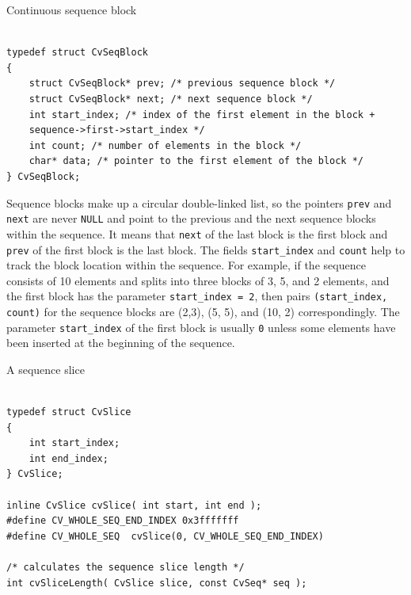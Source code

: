 \label{CvSeqBlock}

Continuous sequence block

\begin{lstlisting}

typedef struct CvSeqBlock
{
    struct CvSeqBlock* prev; /* previous sequence block */
    struct CvSeqBlock* next; /* next sequence block */
    int start_index; /* index of the first element in the block +
    sequence->first->start_index */
    int count; /* number of elements in the block */
    char* data; /* pointer to the first element of the block */
} CvSeqBlock;

\end{lstlisting}

Sequence blocks make up a circular double-linked list, so the pointers
\texttt{prev} and \texttt{next} are never \texttt{NULL} and point to the
previous and the next sequence blocks within the sequence. It means that
\texttt{next} of the last block is the first block and \texttt{prev} of
the first block is the last block. The fields \texttt{start\_index} and
\texttt{count} help to track the block location within the sequence. For
example, if the sequence consists of 10 elements and splits into three
blocks of 3, 5, and 2 elements, and the first block has the parameter
\texttt{start\_index = 2}, then pairs \texttt{(start\_index, count)} for the sequence
blocks are
(2,3), (5, 5), and (10, 2)
correspondingly. The parameter
\texttt{start\_index} of the first block is usually \texttt{0} unless
some elements have been inserted at the beginning of the sequence.

\label{CvSlice}

A sequence slice

\begin{lstlisting}

typedef struct CvSlice
{
    int start_index;
    int end_index;
} CvSlice;

inline CvSlice cvSlice( int start, int end );
#define CV_WHOLE_SEQ_END_INDEX 0x3fffffff
#define CV_WHOLE_SEQ  cvSlice(0, CV_WHOLE_SEQ_END_INDEX)

/* calculates the sequence slice length */
int cvSliceLength( CvSlice slice, const CvSeq* seq );

\end{lstlisting}

